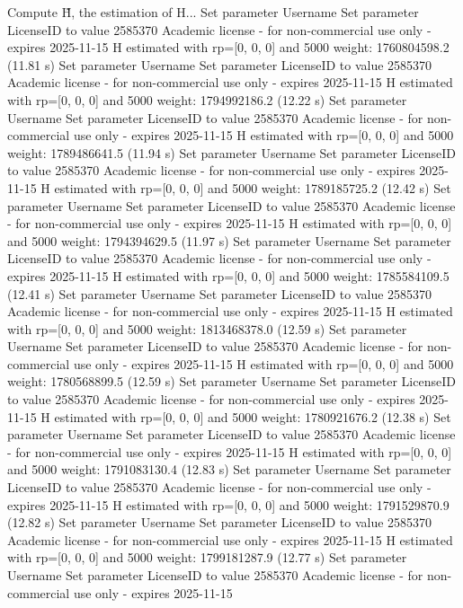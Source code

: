 Compute H̃, the estimation of H...
Set parameter Username
Set parameter LicenseID to value 2585370
Academic license - for non-commercial use only - expires 2025-11-15
  H estimated with rp=[0, 0, 0] and 5000 weight:  1760804598.2  (11.81 s)
Set parameter Username
Set parameter LicenseID to value 2585370
Academic license - for non-commercial use only - expires 2025-11-15
  H estimated with rp=[0, 0, 0] and 5000 weight:  1794992186.2  (12.22 s)
Set parameter Username
Set parameter LicenseID to value 2585370
Academic license - for non-commercial use only - expires 2025-11-15
  H estimated with rp=[0, 0, 0] and 5000 weight:  1789486641.5  (11.94 s)
Set parameter Username
Set parameter LicenseID to value 2585370
Academic license - for non-commercial use only - expires 2025-11-15
  H estimated with rp=[0, 0, 0] and 5000 weight:  1789185725.2  (12.42 s)
Set parameter Username
Set parameter LicenseID to value 2585370
Academic license - for non-commercial use only - expires 2025-11-15
  H estimated with rp=[0, 0, 0] and 5000 weight:  1794394629.5  (11.97 s)
Set parameter Username
Set parameter LicenseID to value 2585370
Academic license - for non-commercial use only - expires 2025-11-15
  H estimated with rp=[0, 0, 0] and 5000 weight:  1785584109.5  (12.41 s)
Set parameter Username
Set parameter LicenseID to value 2585370
Academic license - for non-commercial use only - expires 2025-11-15
  H estimated with rp=[0, 0, 0] and 5000 weight:  1813468378.0  (12.59 s)
Set parameter Username
Set parameter LicenseID to value 2585370
Academic license - for non-commercial use only - expires 2025-11-15
  H estimated with rp=[0, 0, 0] and 5000 weight:  1780568899.5  (12.59 s)
Set parameter Username
Set parameter LicenseID to value 2585370
Academic license - for non-commercial use only - expires 2025-11-15
  H estimated with rp=[0, 0, 0] and 5000 weight:  1780921676.2  (12.38 s)
Set parameter Username
Set parameter LicenseID to value 2585370
Academic license - for non-commercial use only - expires 2025-11-15
  H estimated with rp=[0, 0, 0] and 5000 weight:  1791083130.4  (12.83 s)
Set parameter Username
Set parameter LicenseID to value 2585370
Academic license - for non-commercial use only - expires 2025-11-15
  H estimated with rp=[0, 0, 0] and 5000 weight:  1791529870.9  (12.82 s)
Set parameter Username
Set parameter LicenseID to value 2585370
Academic license - for non-commercial use only - expires 2025-11-15
  H estimated with rp=[0, 0, 0] and 5000 weight:  1799181287.9  (12.77 s)
Set parameter Username
Set parameter LicenseID to value 2585370
Academic license - for non-commercial use only - expires 2025-11-15
